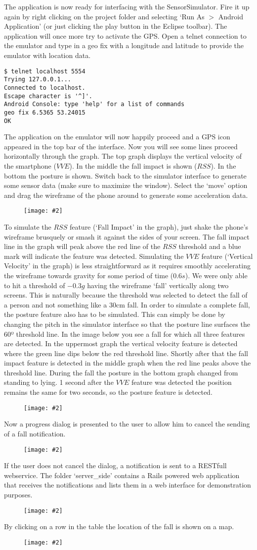 \documentclass[a4paper, 10pt]{article}
\newcommand{\image}[3][\textwidth]{%
  \begin{figure}[H]%
    \centering%
    \ifthenelse{\isempty{#3}}%
      {\setlength\fboxsep{0pt}\fbox{\texttt{[image: \#2]}}}%
      {\texttt{[image: \#2]}}%
    \label{fig:{#2}}%
  \end{figure}
}
\begin{document}
The application is now ready for interfacing with the SensorSimulator. Fire it up again by right clicking on the project folder and selecting `Run As $>$ Android Application' (or just clicking the play button in the Eclipse toolbar). The application will once more try to activate the GPS. Open a telnet connection to the emulator and type in a geo fix with a longitude and latitude to provide the emulator with location data.
\begin{lstlisting}
$ telnet localhost 5554
Trying 127.0.0.1...
Connected to localhost.
Escape character is '^]'.
Android Console: type 'help' for a list of commands
geo fix 6.5365 53.24015
OK
\end{lstlisting}
The application on the emulator will now happily proceed and a GPS icon appeared in the top bar of the interface. Now you will see some lines proceed horizontally through the graph. The top graph displays the vertical velocity of the smartphone ($VVE$). In the middle the fall impact is shown ($RSS$). In the bottom the posture is shown. Switch back to the simulator interface to generate some sensor data (make sure to maximize the window). Select the `move' option and drag the wireframe of the phone around to generate some acceleration data.
\image{simulator.png}{}
To simulate the $RSS$ feature (`Fall Impact' in the graph), just shake the phone's wireframe brusquely or smash it against the sides of your screen. The fall impact line in the graph will peak above the red line of the $RSS$ threshold and a blue mark will indicate the feature was detected. Simulating the $VVE$ feature (`Vertical Velocity' in the graph) is less straightforward as it requires smoothly accelerating the wireframe towards gravity for some period of time ($0.6s$). We were only able to hit a threshold of $-0.3g$ having the wireframe `fall' vertically along two screens. This is naturally because the threshold was selected to detect the fall of a person and not something like a 30cm fall. In order to simulate a complete fall, the posture feature also has to be simulated. This can simply be done by changing the pitch in the simulator interface so that the posture line surfaces the 60º threshold line. 
\newpage
In the image below you see a fall for which all three features are detected. In the uppermost graph the vertical velocity feature is detected where the green line dips below the red threshold line. Shortly after that the fall impact feature is detected in the middle graph when the red line peaks above the threshold line. During the fall the posture in the bottom graph changed from standing to lying. 1 second after the $VVE$ feature was detected the position remains the same for two seconds, so the posture feature is detected.
\image{fall_detected.png}{}
Now a progress dialog is presented to the user to allow him to cancel the sending of a fall notification.
\image{sending_notification.png}{}
\newpage
If the user does not cancel the dialog, a notification is sent to a RESTfull webservice. The folder `server\_side' contains a Rails powered web application that receives the notifications and lists them in a web interface for demonstration purposes. 
\image{server_site.png}{}
By clicking on a row in the table the location of the fall is shown on a map.
\image{map.png}{}
\end{document}
